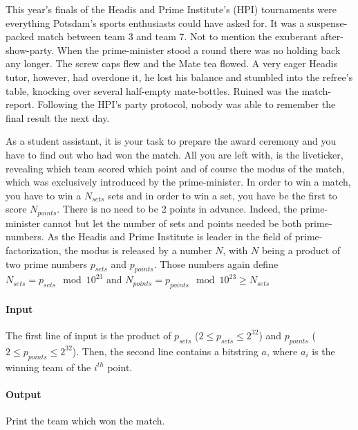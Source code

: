 



\makeheader

This year's finals of the Headis and Prime Institute's (HPI) tournaments were everything Potsdam's sports enthusiasts could have asked for.
It was a suspense-packed match between team 3 and team 7.
Not to mention the exuberant after-show-party.
When the prime-minister stood a round there was no holding back any longer.
The screw caps flew and the Mate tea flowed.
A very eager Headis tutor, however, had overdone it, he lost his balance and stumbled into the refree's table, knocking over several half-empty mate-bottles.
Ruined was the match-report.
Following the HPI's party protocol, nobody was able to remember the final result the next day.

As a student assistant, it is your task to prepare the award ceremony and you have to find out who had won the match.
All you are left with, is the liveticker, revealing which team scored which point and of course the modus of the match,
which was exclusively introduced by the prime-minister.
In order to win a match, you have to win a $N_{sets}$ sets and in order to win a set, you have be the first to score $N_{points}$.
There is no need to be 2 points in advance.
Indeed, the prime-minister cannot but let the number of sets and points needed be both prime-numbers.
As the Headis and Prime Institute is leader in the field of prime-factorization, the modus is released by a number $N$,
with $N$ being a product of two prime numbers $p_{sets}$ and $p_{points}$. Those numbers again define $N_{sets} =
p_{sets} \mod 10^{23}$ and $N_{points} = p_{points} \mod 10^{23} \geq N_{sets}$

\paragraph*{Input}

The first line of input is the product of $p_{sets}$ ($2\leq p_{sets} \leq 2^{32}$) and $p_{points}$ ($2 \leq p_{points}
\leq 2^{32}$).
Then, the second line contains a bitstring $a$, where $a_i$ is the winning team of the $i^{th}$ point.

\paragraph*{Output}

Print the team which won the match.


\begin{samples}
\end{samples}


